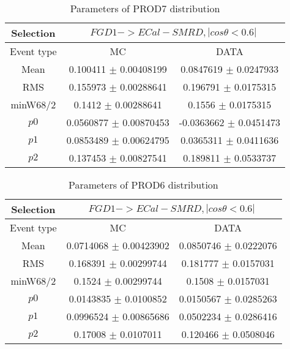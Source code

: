 \documentclass[a4paper,12pt]{article}
\begin{document}
\begin{table}[htbp]
\begin{center}
\begin{tabular}{|c|c|c|}
        \hline
        Selection & \multicolumn{2}{|c|}{$FGD1->ECal-SMRD, |cos\theta<0.6|$}  \\ \hline
        Event type & MC & DATA \\ 
        \hline
        Mean & 0.100411 $\pm$ 0.00408199 & 0.0847619 $\pm$ 0.0247933 \\ 
        \hline 
        RMS & 0.155973 $\pm$ 0.00288641 & 0.196791 $\pm$ 0.0175315 \\ 
        \hline 
        minW68/2 & 0.1412 $\pm$ 0.00288641 & 0.1556 $\pm$ 0.0175315 \\ 
        \hline 
        $p0$ & 0.0560877 $\pm$ 0.00870453 & -0.0363662 $\pm$ 0.0451473 \\ 
        \hline 
        $p1$ & 0.0853489 $\pm$ 0.00624795 & 0.0365311 $\pm$ 0.0411636 \\ 
        \hline 
        $p2$ & 0.137453 $\pm$ 0.00827541 & 0.189811 $\pm$ 0.0533737 \\ 
        \hline 
\end{tabular}
\caption{Parameters of PROD7 distribution } \vspace{0.2in}
\label{xxx}
\end{center}
\end{table}
\begin{table}[htbp]
\begin{center}
\begin{tabular}{|c|c|c|}
        \hline
        Selection & \multicolumn{2}{|c|}{$FGD1->ECal-SMRD, |cos\theta<0.6|$}  \\ \hline
        Event type & MC & DATA \\ 
        \hline
        Mean & 0.0714068 $\pm$ 0.00423902 & 0.0850746 $\pm$ 0.0222076 \\ 
        \hline 
        RMS & 0.168391 $\pm$ 0.00299744 & 0.181777 $\pm$ 0.0157031 \\ 
        \hline 
        minW68/2 & 0.1524 $\pm$ 0.00299744 & 0.1508 $\pm$ 0.0157031 \\ 
        \hline 
        $p0$ & 0.0143835 $\pm$ 0.0100852 & 0.0150567 $\pm$ 0.0285263 \\ 
        \hline 
        $p1$ & 0.0996524 $\pm$ 0.00865686 & 0.0502234 $\pm$ 0.0286416 \\ 
        \hline 
        $p2$ & 0.17008 $\pm$ 0.0107011 & 0.120466 $\pm$ 0.0508046 \\ 
        \hline 
\end{tabular}
\caption{Parameters of PROD6 distribution } \vspace{0.2in}
\label{xxx}
\end{center}
\end{table}
\end{document}
